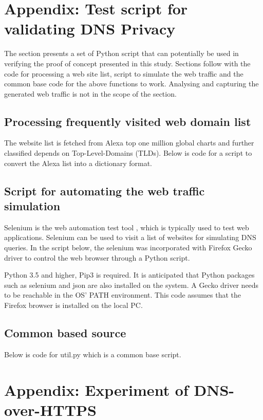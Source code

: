 \documentclass[a4paper,12pt]{article}
\begin{document}
\hypersetup{urlcolor=black}


\newpage
\setcounter{page}{1} %
\appendix

\section{Appendix: Test script for validating DNS Privacy}\label{scriptcode-appendix}
The section presents a set of Python script that can potentially be used in verifying the proof of concept presented in this study.
Sections follow with the code for processing a web site list, script to simulate the web traffic and the common base code for the above functions to work.
Analysing and capturing the generated web traffic is not in the scope of the section.

\subsection{Processing frequently visited web domain list} \label{processweblist}
The website list is fetched from Alexa top one million global charts and further classified depends on Top-Level-Domains (TLDs).
Below is code for a script to convert the Alexa list into a dictionary format.

\subsection{Script for automating the web traffic simulation}
Selenium is the web automation test tool \cite{holmes2006automating}, which is typically used to test web applications. Selenium can be used to visit a list of websites for simulating DNS queries. In the script below, the selenium was incorporated with Firefox Gecko driver to control the web browser through a Python script.

Python 3.5 and higher, Pip3 is required. It is anticipated that Python packages such as selenium and json are also installed on the system. A Gecko driver needs to be reachable in the OS' PATH environment. This code assumes that the Firefox browser is installed on the local PC.

\subsection{Common based source}
Below is code for util.py which is a common base script.
\newpage

\section{Appendix: Experiment of DNS-over-HTTPS}\label{protocol-verification}

\end{document}
